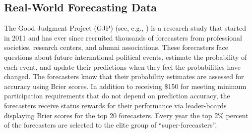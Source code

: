 \documentclass[11pt]{article}
\theoremstyle{definition}
\theoremstyle{definition}
\begin{document}
\subsection{Real-World Forecasting Data}
\label{realData}
The Good Judgment Project (GJP) (see, e.g., \citealt{mellers2014psychological, ungar2012good}) is 
a research study that started in 2011 and has ever since recruited thousands of forecasters 
from professional societies, research centers, and alumni associations. 
These forecasters face questions about future international 
political events, estimate the probability of each event, and 
update their predictions when they feel the probabilities have changed.  
The forecasters know that their probability estimates are assessed 
for accuracy using Brier scores. 
 In addition to receiving 
\$150 for meeting minimum participation requirements that do not depend 
on prediction accuracy, the forecasters receive status rewards for 
their performance via leader-boards displaying Brier scores for the 
top 20 forecasters.  Every year the top 2\% percent of the forecasters 
are selected to the elite group of ``super-forecasters''.  
\end{document}
